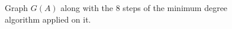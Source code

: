 \begin{figure}[!tbh]
   \caption{Graph $G(A)$ along with the 8 steps of the minimum degree algorithm applied on it. }
   \label{fig:problem_4}
\end{figure}
